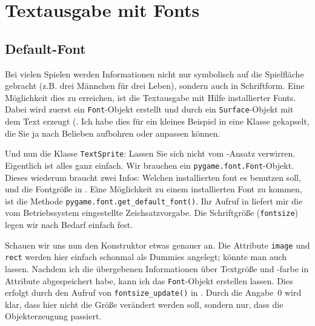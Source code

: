 \newpage
\section{Textausgabe mit Fonts}
\subsection{Default-Font}

Bei vielen Spielen werden Informationen nicht nur symbolisch auf die Spielfläche gebracht (z.B. drei Männchen für drei Leben), sondern auch in Schriftform. Eine Möglichkeit dies zu erreichen, ist die Textausgabe mit Hilfe installierter Fonts. Dabei wird zuerst ein \texttt{Font}-Objekt erstellt und durch ein \texttt{Surface}-Objekt mit dem Text erzeugt (. Ich habe dies für ein kleines Beispiel in eine Klasse gekapselt, die Sie ja nach Belieben aufbohren oder anpassen können.



Und nun die Klasse \texttt{TextSprite}: Lassen Sie sich nicht vom -Ansatz verwirren. Eigentlich ist alles ganz einfach. Wir brauchen ein \texttt{pygame.font.\-Font}-Objekt. Dieses wiederum braucht zwei Infos: Welchen installierten \Gls{font} es benutzen soll, und die Fontgröße in . Eine Möglichkeit zu einem installierten Font zu kommen, ist die Methode \texttt{pygame.font.get\_default\_font()}. Ihr Aufruf in  liefert mir die vom Betriebssystem eingestellte Zeichsatzvorgabe. Die Schriftgröße (\texttt{fontsize}) legen wir nach Bedarf einfach fest. 


Schauen wir uns nun den Konstruktor etwas genauer an. Die  Attribute \texttt{image} und \texttt{rect} werden hier einfach schonmal als Dummies angelegt; könnte man auch lassen. Nachdem ich die übergebenen Informationen über Textgröße und -farbe in Attribute abgespeichert habe, kann ich das \texttt{Font}-Objekt erstellen lassen. Dies erfolgt durch den Aufruf von \texttt{fontsize\_update()} in . Durch die Angabe~0 wird klar, dass hier nicht die Größe verändert werden soll, sondern nur, dass die Objekterzeugung passiert. 

